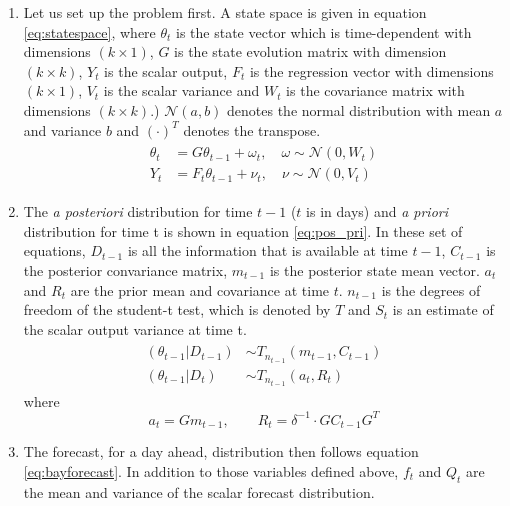 \documentclass[a4paper]{article}
\begin{document}
\begin{enumerate}
\item Let us set up the problem first. A state space is given in equation \ref{eq:statespace}, where $\theta_t$ is the state vector which is time-dependent with dimensions $(k \times 1)$, $G$ is the state evolution matrix with dimension $(k \times k)$, $Y_t$ is the scalar output, $F_t$ is the regression vector with dimensions $(k \times 1)$, $V_t$ is the scalar variance and $W_t$ is the covariance matrix with dimensions $(k \times k)$.) $\mathscr{N}(a,b)$ denotes the normal distribution with mean $a$ and variance $b$ and $(\cdot)^T$ denotes the transpose.
\begin{align} \label{eq:statespace}
\begin{split}
\theta_t &= G\theta_{t-1} + \omega_t, \quad \omega \sim \mathscr{N}(0,W_t) \\
Y_t &= F_t\theta_{t-1} + \nu_t, \quad \nu \sim \mathscr{N}(0,V_t)
\end{split}
\end{align}
%
\item The \textit{a posteriori} distribution for time $t-1$ ($t$ is in days) and \textit{a priori} distribution for time t is shown in equation \ref{eq:pos_pri}. In these set of equations, $D_{t-1}$ is all the information that is available at time $t-1$, $C_{t-1}$ is the posterior convariance matrix, $m_{t-1}$ is the posterior state mean vector. $a_t$ and $R_t$ are the prior mean and covariance at time $t$. $n_{t-1}$ is the degrees of freedom of the student-t test, which is denoted by $T$ and $S_t$ is an estimate of the scalar output variance at time t.
%
\begin{align} \label{eq:pos_pri}
\begin{split}
(\theta_{t-1}|D_{t-1}) &\sim T_{n_{t-1}}(m_{t-1},C_{t-1}) \\
(\theta_{t-1}| D_t) &\sim T_{n_{t-1}}(a_t,R_t)
\end{split}
\end{align}
%
where
%
\begin{equation*}
a_t = Gm_{t-1}, \qquad R_t = \delta^{-1} \cdot GC_{t-1}G^T
\end{equation*}
%
\item The forecast, for a day ahead, distribution then follows equation \ref{eq:bayforecast}. In addition to those variables defined above, $f_t$ and $Q_t$ are the mean and variance of the scalar forecast distribution.
%
\begin{align} \label{eq:bayforecast}
\begin{split}

\end{split}
\end{align}
\end{enumerate}
\end{document}
